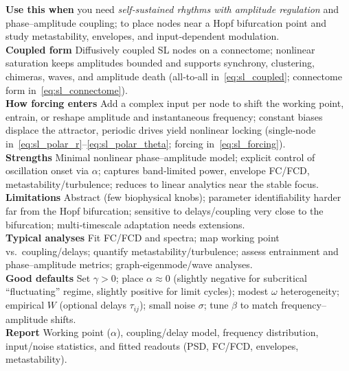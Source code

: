 \documentclass[12pt]{article}
\numberwithin{equation}{section}
\begin{document}
\begin{tcolorbox}[
  colback=gray!5,
  colframe=slate,
  colbacktitle=softblue!25,
  coltitle=softblue!60!black,
  fonttitle=\bfseries\small,
  title={\small When to Use It},
  boxrule=0.4pt, enhanced, sharp corners,
  left=4pt,right=4pt,top=3pt,bottom=3pt,
  boxsep=2pt, before skip=6pt, after skip=6pt
]
\scriptsize
\textbf{Use this when} you need \emph{self‑sustained rhythms with amplitude regulation} and phase–amplitude coupling; to place nodes near a Hopf bifurcation point and study metastability, envelopes, and input‑dependent modulation.\\
\textbf{Coupled form} Diffusively coupled SL nodes on a connectome; nonlinear saturation keeps amplitudes bounded and supports synchrony, clustering, chimeras, waves, and amplitude death (all‑to‑all in~\eqref{eq:sl_coupled}; connectome form in~\eqref{eq:sl_connectome}).\\
\textbf{How forcing enters} Add a complex input per node to shift the working point, entrain, or reshape amplitude and instantaneous frequency; constant biases displace the attractor, periodic drives yield nonlinear locking (single‑node in~\eqref{eq:sl_polar_r}–\eqref{eq:sl_polar_theta}; forcing in~\eqref{eq:sl_forcing}).\\
\textbf{Strengths} Minimal nonlinear phase–amplitude model; explicit control of oscillation onset via $\alpha$; captures band‑limited power, envelope FC/FCD, metastability/turbulence; reduces to linear analytics near the stable focus.\\
\textbf{Limitations} Abstract (few biophysical knobs); parameter identifiability harder far from the Hopf bifurcation; sensitive to delays/coupling very close to the bifurcation; multi‑timescale adaptation needs extensions.\\
\textbf{Typical analyses} Fit FC/FCD and spectra; map working point vs.\ coupling/delays; quantify metastability/turbulence; assess entrainment and phase–amplitude metrics; graph‑eigenmode/wave analyses.\\
\textbf{Good defaults} Set $\gamma>0$; place $\alpha\approx 0$ (slightly negative for subcritical “fluctuating” regime, slightly positive for limit cycles); modest $\omega$ heterogeneity; empirical $W$ (optional delays $\tau_{ij}$); small noise $\sigma$; tune $\beta$ to match frequency–amplitude shifts.\\
\textbf{Report} Working point ($\alpha$), coupling/delay model, frequency distribution, input/noise statistics, and fitted readouts (PSD, FC/FCD, envelopes, metastability).
\end{tcolorbox}
\end{document}
